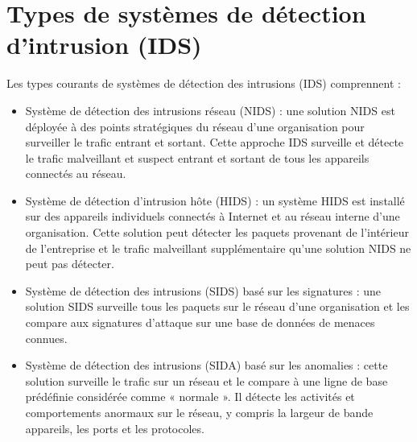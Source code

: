 \documentclass[a4paper,12pt]{report}
\begin{document}
\section{Types de systèmes de détection d’intrusion (IDS)}
\noindent \normalsize Les types courants de systèmes de détection des  intrusions (IDS) comprennent :
\begin{itemize}
    \item Système de détection des intrusions réseau (NIDS) : une solution NIDS est déployée à des points stratégiques du réseau d’une organisation pour surveiller le trafic entrant et sortant. Cette approche IDS surveille et détecte le trafic malveillant et suspect entrant et sortant de tous les appareils connectés au réseau.
    \item Système de détection d’intrusion hôte (HIDS) : un système HIDS est installé sur des appareils individuels connectés à Internet et au réseau interne d’une organisation. Cette solution peut détecter les paquets provenant de l’intérieur de l’entreprise et le trafic malveillant supplémentaire qu’une solution NIDS ne peut pas détecter.\\[0.1cm]
    \item Système de détection des intrusions (SIDS) basé sur les signatures : une solution SIDS surveille tous les paquets sur le réseau d’une organisation et les compare aux signatures d’attaque sur une base de données de menaces connues.\\[0.1cm]
    \item Système de détection des intrusions (SIDA) basé sur les anomalies : cette solution surveille le trafic sur un réseau et le compare à une ligne de base prédéfinie considérée comme « normale ». Il détecte les activités et comportements anormaux sur le réseau, y compris la largeur de bande appareils, les ports et les protocoles.
\end{itemize}
\end{document}
